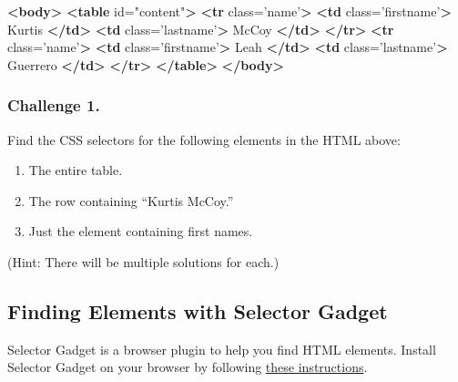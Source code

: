 \documentclass[]{book}
\newenvironment{Shaded}{\begin{snugshade}}{\end{snugshade}}
\newcommand{\KeywordTok}[1]{\textcolor[rgb]{0.13,0.29,0.53}{\textbf{#1}}}
\newcommand{\StringTok}[1]{\textcolor[rgb]{0.31,0.60,0.02}{#1}}
\newcommand{\OtherTok}[1]{\textcolor[rgb]{0.56,0.35,0.01}{#1}}
\newcommand{\NormalTok}[1]{#1}
\providecommand{\tightlist}{%
  \setlength{\itemsep}{0pt}\setlength{\parskip}{0pt}}
\begin{document}
\begin{Shaded}
\begin{Highlighting}[]
\KeywordTok{<body>}
    \KeywordTok{<table}\OtherTok{ id=}\StringTok{"content"}\KeywordTok{>}
        \KeywordTok{<tr}\OtherTok{ class=}\StringTok{'name'}\KeywordTok{>}
            \KeywordTok{<td}\OtherTok{ class=}\StringTok{'firstname'}\KeywordTok{>}
\NormalTok{                Kurtis}
            \KeywordTok{</td>}
            \KeywordTok{<td}\OtherTok{ class=}\StringTok{'lastname'}\KeywordTok{>}
\NormalTok{                McCoy}
            \KeywordTok{</td>}
        \KeywordTok{</tr>}
        \KeywordTok{<tr}\OtherTok{ class=}\StringTok{'name'}\KeywordTok{>}
            \KeywordTok{<td}\OtherTok{ class=}\StringTok{'firstname'}\KeywordTok{>}
\NormalTok{                Leah}
            \KeywordTok{</td>}
            \KeywordTok{<td}\OtherTok{ class=}\StringTok{'lastname'}\KeywordTok{>}
\NormalTok{                Guerrero}
            \KeywordTok{</td>}
        \KeywordTok{</tr>}
    \KeywordTok{</table>}
\KeywordTok{</body>}
\end{Highlighting}
\end{Shaded}

\subsubsection*{Challenge 1.}\label{challenge-1.-15}

Find the CSS selectors for the following elements in the HTML above:

\begin{enumerate}
\def\labelenumi{\arabic{enumi}.}
\tightlist
\item
  The entire table.
\item
  The row containing ``Kurtis McCoy.''
\item
  Just the element containing first names.
\end{enumerate}

(Hint: There will be multiple solutions for each.)

\subsection{Finding Elements with Selector
Gadget}\label{finding-elements-with-selector-gadget}

Selector Gadget is a browser plugin to help you find HTML elements.
Install Selector Gadget on your browser by following
\href{https://selectorgadget.com/}{these instructions}.
\end{document}
